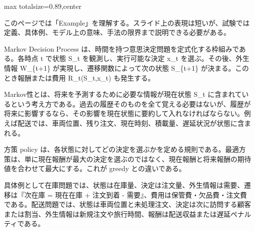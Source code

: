 \begin{minipage}[t]{0.58\textwidth}
\begin{adjustbox}{max totalsize={\textwidth}{0.89\textheight},center}
\begin{minipage}{\textwidth}\scriptsize
{}このページでは「Example」を理解する。スライド上の表現は短いが、試験では定義、具体例、モデル上の意味、手法の限界まで説明できる必要がある。\par
Markov Decision Process は、時間を持つ意思決定問題を定式化する枠組みである。各時点 t で状態 S\_t を観測し、実行可能な決定 x\_t を選ぶ。その後、外生情報 W\_\{t+1\} が実現し、遷移関数によって次の状態 S\_\{t+1\} が決まる。このとき報酬または費用 R\_t(S\_t,x\_t) も発生する。\par
Markov性とは、将来を予測するために必要な情報が現在状態 S\_t に含まれているという考え方である。過去の履歴そのものを全て覚える必要はないが、履歴が将来に影響するなら、その影響を現在状態に要約して入れなければならない。例えば配送では、車両位置、残り注文、現在時刻、積載量、遅延状況が状態に含まれる。\par
方策 policy は、各状態に対してどの決定を選ぶかを定める規則である。最適方策は、単に現在報酬が最大の決定を選ぶのではなく、現在報酬と将来報酬の期待値を合わせて最大にする。これが greedy との違いである。\par
具体例として在庫問題では、状態は在庫量、決定は注文量、外生情報は需要、遷移は『次在庫 = 現在在庫 + 注文到着 - 需要』、費用は保管費・欠品費・注文費である。配送問題では、状態は車両位置と未処理注文、決定は次に訪問する顧客または割当、外生情報は新規注文や旅行時間、報酬は配送収益または遅延ペナルティである。\par

\end{minipage}
\end{adjustbox}
\end{minipage}
